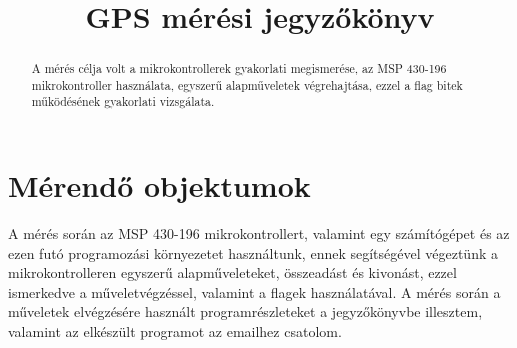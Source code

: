 \documentclass[10pt, conference,a4paper]{ITKproc}
\begin{document}
\title{GPS mérési jegyzőkönyv}
\author{
}


\maketitle

\begin{abstract}
A mérés célja volt a mikrokontrollerek gyakorlati megismerése, az MSP 430-196 mikrokontroller használata, egyszerű alapműveletek végrehajtása, ezzel a flag bitek működésének gyakorlati vizsgálata. 
\end{abstract}

\IEEEpeerreviewmaketitle
\section{Mérendő objektumok}

A mérés során az MSP 430-196 mikrokontrollert, valamint egy számítógépet és az ezen futó programozási környezetet használtunk, ennek segítségével végeztünk a mikrokontrolleren egyszerű alapműveleteket, összeadást és kivonást, ezzel ismerkedve a műveletvégzéssel, valamint a flagek használatával. A mérés során a műveletek elvégzésére használt programrészleteket a jegyzőkönyvbe illesztem, valamint az elkészült programot az emailhez csatolom. 
\end{document}
